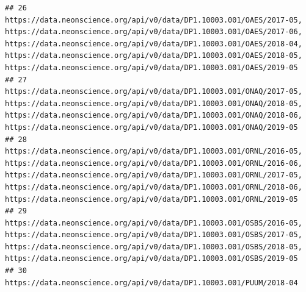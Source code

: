 \documentclass[]{book}
\begin{document}
\begin{verbatim}
## 26                                                                                                                                                                                                                                                                                     https://data.neonscience.org/api/v0/data/DP1.10003.001/OAES/2017-05, https://data.neonscience.org/api/v0/data/DP1.10003.001/OAES/2017-06, https://data.neonscience.org/api/v0/data/DP1.10003.001/OAES/2018-04, https://data.neonscience.org/api/v0/data/DP1.10003.001/OAES/2018-05, https://data.neonscience.org/api/v0/data/DP1.10003.001/OAES/2019-05
## 27                                                                                                                                                                                                                                                                                                                                                          https://data.neonscience.org/api/v0/data/DP1.10003.001/ONAQ/2017-05, https://data.neonscience.org/api/v0/data/DP1.10003.001/ONAQ/2018-05, https://data.neonscience.org/api/v0/data/DP1.10003.001/ONAQ/2018-06, https://data.neonscience.org/api/v0/data/DP1.10003.001/ONAQ/2019-05
## 28                                                                                                                                                                                                                                                                                     https://data.neonscience.org/api/v0/data/DP1.10003.001/ORNL/2016-05, https://data.neonscience.org/api/v0/data/DP1.10003.001/ORNL/2016-06, https://data.neonscience.org/api/v0/data/DP1.10003.001/ORNL/2017-05, https://data.neonscience.org/api/v0/data/DP1.10003.001/ORNL/2018-06, https://data.neonscience.org/api/v0/data/DP1.10003.001/ORNL/2019-05
## 29                                                                                                                                                                                                                                                                                                                                                          https://data.neonscience.org/api/v0/data/DP1.10003.001/OSBS/2016-05, https://data.neonscience.org/api/v0/data/DP1.10003.001/OSBS/2017-05, https://data.neonscience.org/api/v0/data/DP1.10003.001/OSBS/2018-05, https://data.neonscience.org/api/v0/data/DP1.10003.001/OSBS/2019-05
## 30                                                                                                                                                                                                                                                                                                                                                                                                                                                                                                                                                                         https://data.neonscience.org/api/v0/data/DP1.10003.001/PUUM/2018-04

\end{verbatim}
\end{document}
